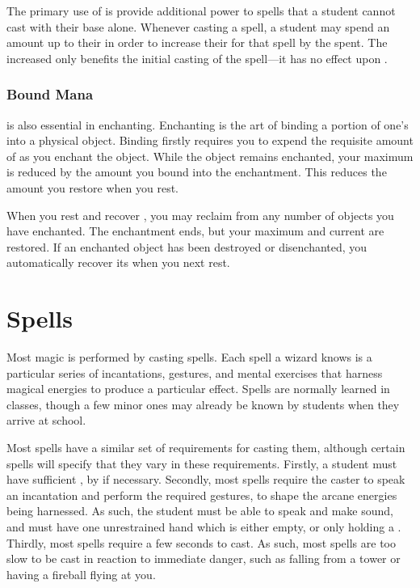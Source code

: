 The primary use of {\mana} is provide additional power to spells that a student cannot cast with their base {\focus} alone.
Whenever casting a spell, a student may spend an amount {\mana} up to their {\overchannel} in order to increase their {\focus} for that spell by the {\mana} spent.
The increased {\focus} only benefits the initial casting of the spell---it has no effect upon {\concentration}.

\subsubsection{Bound Mana}

\capital{\mana} is also essential in enchanting.
Enchanting is the art of binding a portion of one's {\mana} into a physical object.
Binding {\mana} firstly requires you to expend the requisite amount of {\mana} as you enchant the object.
While the object remains enchanted, your maximum {\mana} is reduced by the amount you bound into the enchantment.
This reduces the amount you restore when you rest.

When you rest and recover {\mana}, you may reclaim {\mana} from any number of objects you have enchanted.
The enchantment ends, but your maximum and current {\mana} are restored.
If an enchanted object has been destroyed or disenchanted, you automatically recover its {\mana} when you next rest.

\section{Spells}

Most magic is performed by casting spells.
Each spell a wizard knows is a particular series of incantations, gestures, and mental exercises that harness magical energies to produce a particular effect.
Spells are normally learned in classes, though a few minor ones may already be known by students when they arrive at school.

Most spells have a similar set of requirements for casting them, although certain spells will specify that they vary in these requirements.
Firstly, a student must have sufficient {\focus}, by {\overchannelling} if necessary.
Secondly, most spells require the caster to speak an incantation and perform the required gestures, to shape the arcane energies being harnessed.
As such, the student must be able to speak and make sound, and must have one unrestrained hand which is either empty, or only holding a {\castingtool}.
Thirdly, most spells require a few seconds to cast.
As such, most spells are too slow to be cast in reaction to immediate danger, such as falling from a tower or having a fireball flying at you.

